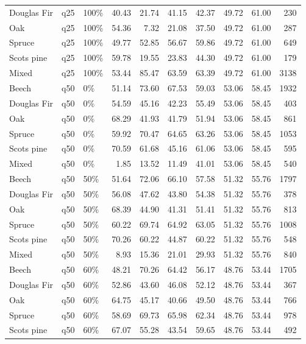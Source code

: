\begin{longtable}{lllrrrrrrr}
  Douglas Fir & q25 & 100\% & 40.43 & 21.74 & 41.15 & 42.37 & 49.72 & 61.00 & 230 \\ 
  Oak & q25 & 100\% & 54.36 & 7.32 & 21.08 & 37.50 & 49.72 & 61.00 & 287 \\ 
  Spruce & q25 & 100\% & 49.77 & 52.85 & 56.67 & 59.86 & 49.72 & 61.00 & 649 \\ 
  Scots pine & q25 & 100\% & 59.78 & 19.55 & 23.83 & 44.30 & 49.72 & 61.00 & 179 \\ 
  Mixed & q25 & 100\% & 53.44 & 85.47 & 63.59 & 63.39 & 49.72 & 61.00 & 3138 \\ 
  Beech & q50 & 0\% & 51.14 & 73.60 & 67.53 & 59.03 & 53.06 & 58.45 & 1932 \\ 
  Douglas Fir & q50 & 0\% & 54.59 & 45.16 & 42.23 & 55.49 & 53.06 & 58.45 & 403 \\ 
  Oak & q50 & 0\% & 68.29 & 41.93 & 41.79 & 51.94 & 53.06 & 58.45 & 861 \\ 
  Spruce & q50 & 0\% & 59.92 & 70.47 & 64.65 & 63.26 & 53.06 & 58.45 & 1053 \\ 
  Scots pine & q50 & 0\% & 70.59 & 61.68 & 45.16 & 61.06 & 53.06 & 58.45 & 595 \\ 
  Mixed & q50 & 0\% & 1.85 & 13.52 & 11.49 & 41.01 & 53.06 & 58.45 & 540 \\ 
  Beech & q50 & 50\% & 51.64 & 72.06 & 66.10 & 57.58 & 51.32 & 55.76 & 1797 \\ 
  Douglas Fir & q50 & 50\% & 56.08 & 47.62 & 43.80 & 54.38 & 51.32 & 55.76 & 378 \\ 
  Oak & q50 & 50\% & 68.39 & 44.90 & 41.31 & 51.41 & 51.32 & 55.76 & 813 \\ 
  Spruce & q50 & 50\% & 60.22 & 69.74 & 64.92 & 63.05 & 51.32 & 55.76 & 1008 \\ 
  Scots pine & q50 & 50\% & 70.26 & 60.22 & 44.87 & 60.22 & 51.32 & 55.76 & 548 \\ 
  Mixed & q50 & 50\% & 8.93 & 15.36 & 21.01 & 29.93 & 51.32 & 55.76 & 840 \\ 
  Beech & q50 & 60\% & 48.21 & 70.26 & 64.42 & 56.17 & 48.76 & 53.44 & 1705 \\ 
  Douglas Fir & q50 & 60\% & 52.86 & 43.60 & 46.08 & 52.12 & 48.76 & 53.44 & 367 \\ 
  Oak & q50 & 60\% & 64.75 & 45.17 & 40.66 & 49.50 & 48.76 & 53.44 & 766 \\ 
  Spruce & q50 & 60\% & 58.69 & 69.73 & 65.98 & 62.34 & 48.76 & 53.44 & 978 \\ 
  Scots pine & q50 & 60\% & 67.07 & 55.28 & 43.54 & 59.65 & 48.76 & 53.44 & 492 \\ 

\end{longtable}
